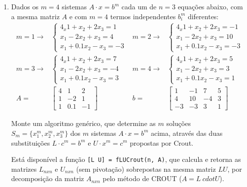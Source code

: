 \documentclass[12pt]{article}
\begin{document}
\begin{enumerate}[label=\textbf{\arabic*})]
\item Dados os $m = 4$ sistemas $A \cdot x = b^m$ cada um de $n = 3$ equações
abaixo, com a mesma matriz $A$ e com $m = 4$ termos independentes $b_i^m$
diferentes:
\begin{align*}
m = 1 \longrightarrow &
\begin{cases}
4_x1 + x_2 + 2x_3 = 1 \\
x_1 - 2x_2 + x_3 = 4 \\
x_1 + 0.1x_2 - x_3 = -3
\end{cases} &
m = 2 \longrightarrow &
\begin{cases}
4_x1 + x_2 + 2x_3 = -1 \\
x_1 - 2x_2 + x_3 = 10 \\
x_1 + 0.1x_2 - x_3 = -3
\end{cases} \\
m = 3 \longrightarrow &
\begin{cases}
4_x1 + x_2 + 2x_3 = 7 \\
x_1 - 2x_2 + x_3 = -4 \\
x_1 + 0.1x_2 - x_3 = 3
\end{cases} &
m = 4 \longrightarrow &
\begin{cases}
4_x1 + x_2 + 2x_3 = 5 \\
x_1 - 2x_2 + x_3 = 3 \\
x_1 + 0.1x_2 - x_3 = 1
\end{cases} \\
A = &
\begin{bmatrix}
4 & 1 & 2 \\
1 & -2 & 1 \\
1 & 0.1 & -1
\end{bmatrix} &
b = &
\begin{bmatrix}
1 & -1 & 7 & 5 \\
4 & 10 & -4 & 3 \\
-3 & -3 & 3 & 1
\end{bmatrix}
\end{align*}

Monte um algoritmo genérico, que determine as $m$ soluções $S_m = \{x_1^m,
x_2^m, x_3^m\}$ dos $m$ sistemas $A \cdot x = b^m$ acima, através das duas
substituições $L \cdot c^m = b^m$ e $U \cdot x^m = c^m$ propostas por Crout.

Está disponível a função \verb![L U] = fLUCrout(n, A)!, que calcula e retorna
as matrizes $L_{n x n}$ e $U_{n x n}$ (sem pivotação) sobrepostas na mesma
matriz $LU$, por decomposição da matriz $A_{n x n}$ pelo método de CROUT ($A =
L\ cdot U$).


\end{enumerate}
\end{document}
